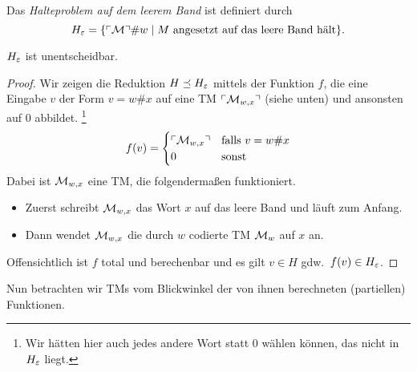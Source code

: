 \begin{Def}[name={[Halteproblem auf leerem Band $H_\Eps$]}]
	Das \emph{Halteproblem auf dem leerem Band} ist definiert durch
	\[H_\varepsilon = \{\ulcorner \mathcal{M} \urcorner\# w \mid M \text{ angesetzt auf das leere Band hält}\}. \qedhere\]
\end{Def}
\begin{Satz}[name={[$H_\Eps$ ist unentscheidbar]}]
\label{satz:HalteproblemLeeresBand}
	$H_\Eps$ ist unentscheidbar.
\end{Satz}
\begin{proof}
  Wir zeigen die Reduktion $H \preceq H_\varepsilon$ mittels der
  Funktion $f$, die eine Eingabe $v$ der Form $v = w\#x$ auf eine \ac{TM} $\ulcorner \mathcal{M}_{w,x} \urcorner$ (siehe unten) und ansonsten auf $0$ abbildet.%
  \footnote{Wir hätten hier auch jedes andere Wort statt 0 wählen können, das nicht in $H_\Eps$ liegt.}
  \[ f(v) = \begin{cases} \ulcorner \mathcal{M}_{w,x} \urcorner & \text{falls } v = w\#x \\ 0 & \text{sonst}\end{cases} \]
  Dabei ist $\mathcal{M}_{w,x}$ eine \ac{TM}, die folgendermaßen funktioniert.
  \begin{itemize}
  \item Zuerst schreibt $\mathcal{M}_{w,x}$ das Wort $x$ auf das leere Band und läuft zum Anfang.
  \item Dann wendet $\mathcal{M}_{w,x}$ die durch $w$ codierte \ac{TM} $\mathcal{M}_w$ auf $x$ an.
  \end{itemize}
  Offensichtlich ist $f$ total und berechenbar und es gilt $v\in H$ gdw.\ $f(v) \in H_\varepsilon$.
\end{proof}

Nun betrachten wir \ac{TM}s vom Blickwinkel der von ihnen berechneten
(partiellen) Funktionen. 

